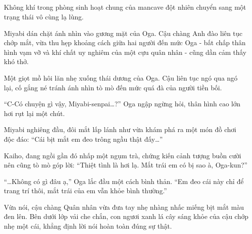 \documentclass[../main.tex]{subfiles}
\begin{document}

\subsection*{\label{ep-M8.I}}
\vspace{-4pt}

Không khí trong phòng sinh hoạt chung của mancave đột nhiên chuyển sang một trạng thái vô cùng lạ lùng.

Miyabi dán chặt ánh nhìn vào gương mặt của Oga. Cậu chàng Anh đào liên tục chớp mắt, vừa thu hẹp khoảng cách giữa hai người đến mức Oga - bất chấp thân hình vạm vỡ và khí chất uy nghiêm của một cựu quân nhân - cũng dần cảm thấy khó thở.

Một giọt mồ hôi lăn nhẹ xuống thái dương của Oga. Cậu liên tục ngó qua ngó lại, cố gắng né tránh ánh nhìn tò mò đến mức quá đà của người tiền bối.

``C-Có chuyện gì vậy, Miyabi-senpai\dots?'' Oga ngập ngừng hỏi, thân hình cao lớn hơi rụt lại một chút.

Miyabi nghiêng đầu, đôi mắt lấp lánh như vừa khám phá ra một món đồ chơi độc đáo: ``Cái bịt mắt em đeo trông ngầu thật đấy\dots''

Kaiho, đang ngồi gần đó nhấp một ngụm trà, chứng kiến cảnh tượng buồn cười nên cũng tò mò góp lời: ``Thiệt tình là hơi lạ. Mắt trái em có bị sao à, Oga-kun?''

``\dots Không có gì đâu ạ,'' Oga lắc đầu một cách bình thản. ``Em đeo cái này chỉ để trang trí thôi, mắt trái của em vẫn khỏe bình thường.''

Vừa nói, cậu chàng Quân nhân vừa đưa tay nhẹ nhàng nhấc miếng bịt mắt màu đen lên. Bên dưới lớp vải che chắn, con ngươi xanh lá cây sáng khỏe của cậu chớp nhẹ một cái, khẳng định lời nói hoàn toàn đúng sự thật.
\end{document}
